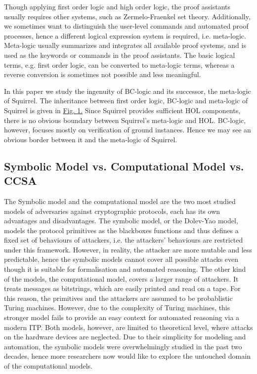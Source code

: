 \documentclass[conference]{IEEEtran}
\begin{document}
Though applying first order logic and high order logic, the proof assistants usually requires other systems, such as Zermelo-Fraenkel set theory. Additionally, we sometimes want to distinguish the user-level commands and automated proof processes, hence a different logical expression system is required, i.e. meta-logic. Meta-logic usually summarizes and integrates all available proof systems, and is used as the keywords or commands in the proof assistants. The basic logical terms, e.g. first order logic, can be converted to meta-logic terms, whereas a reverse conversion is sometimes not possible and less meaningful. \cite{Squirrel}

In this paper we study the ingenuity of BC-logic and its successor, the meta-logic of Squirrel. The inheritance between first order logic, BC-logic and meta-logic of Squirrel is given in \hyperref[figure:1]{Fig. 1.} Since Squirrel provides sufficient HOL components, there is no obvious boundary between Squirrel's meta-logic and HOL. BC-logic, however, focuses mostly on verification of ground instances. Hence we may see an obvious border between it and the meta-logic of Squirrel.

\subsection{Symbolic Model vs. Computational Model vs. CCSA}
\label{sec:back}
The Symbolic model and the computational model are the two most studied models of adversaries against cryptographic protocols, each has its own advantages and disadvantages. The symbolic model, or the Dolev-Yao model, models the protocol primitives as the blackboxes functions and thus defines a fixed set of behaviours of attackers, i.e. the attackers' behaviours are restricted under this framework.\cite{Dolev-Yao} However, in reality, the attacker are more mutable and less predictable, hence the symbolic models cannot cover all possible attacks even though it is suitable for formalisation and automated reasoning. The other kind of the models, the computational model, covers a larger range of attackers. It treats messages as bitstrings, which are easily printed and read on a tape. For this reason, the primitives and the attackers are assumed to be probablistic Turing machines. However, due to the complexity of Turing machines, this stronger model fails to provide an easy context for automated reasoning via a modern ITP. Both models, however, are limited to theoretical level, where attacks on the hardware devices are neglected. Due to their simplicity for modeling and automation, the symbolic models were overwhelmingly studied in the past two decades, hence more researchers now would like to explore the untouched domain of the computational models.\cite{SOK1}
\end{document}

